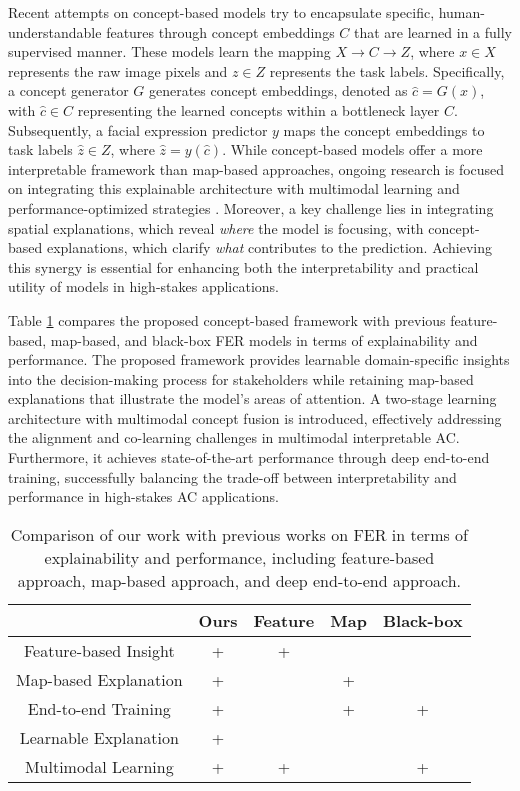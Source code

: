    Recent attempts on concept-based models \cite{xinyuFG24, zarlenga2022concept} try to encapsulate specific, human-understandable features through concept embeddings $C$ that are learned in a fully supervised manner. These models learn the mapping $X \rightarrow C \rightarrow Z$, where $x \in X$ represents the raw image pixels and $z \in Z$ represents the task labels. Specifically, a concept generator $G$ generates concept embeddings, denoted as $\hat{c} = G(x)$, with $\hat{c} \in C$ representing the learned concepts within a bottleneck layer $C$. Subsequently, a facial expression predictor $y$ maps the concept embeddings to task labels $\hat{z} \in Z$, where $\hat{z} = y(\hat{c})$. While concept-based models offer a more interpretable framework than map-based approaches, ongoing research is focused on integrating this explainable architecture with multimodal learning and performance-optimized strategies \cite{xinyuFG24}. Moreover, a key challenge lies in integrating spatial explanations, which reveal \textit{where} the model is focusing, with concept-based explanations, which clarify \textit{what} contributes to the prediction. Achieving this synergy is essential for enhancing both the interpretability and practical utility of models in high-stakes applications.

    Table \ref{tab_previous_work} compares the proposed concept-based framework with previous feature-based, map-based, and black-box FER models in terms of explainability and performance. The proposed framework provides learnable domain-specific insights into the decision-making process for stakeholders while retaining map-based explanations that illustrate the model's areas of attention. A two-stage learning architecture with multimodal concept fusion is introduced, effectively addressing the alignment and co-learning challenges in multimodal interpretable AC. Furthermore, it achieves state-of-the-art performance through deep end-to-end training, successfully balancing the trade-off between interpretability and performance in high-stakes AC applications.

    \begin{table}[t]
    \centering
    \caption{Comparison of our work with previous works on FER in terms of explainability and performance, including feature-based approach, map-based approach, and deep end-to-end approach.}
    \begin{tabular}{ccccc}
    \toprule
                          & Ours & Feature & Map & Black-box \\ \midrule
    Feature-based Insight & +    & +       &     &     \\
    Map-based Explanation & +    &         & +   &     \\
    End-to-end Training   & +    &         & +   & +   \\
    Learnable Explanation & +    &         &     &     \\
    Multimodal Learning   & +    & +       &     & +   \\ 
    \bottomrule
    \end{tabular}
    \label{tab_previous_work}
    \end{table}